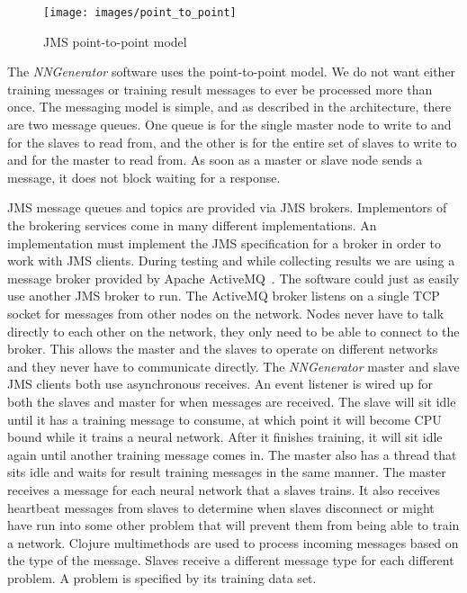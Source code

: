 \begin{figure}[h!]
  \centering
  \texttt{[image: images/point\_to\_point]}
  \caption{JMS point-to-point model}
  \label{point_to_point}
\end{figure}

The {\em NNGenerator} software uses the point-to-point model.
We do not want either training messages or training result messages to ever be processed more than once.
The messaging model is simple, and as described in the architecture, there are two message queues. 
One queue is for the single master node to write to and for the slaves to read from, and the other is for the entire set of slaves to write to and for the master to read from. 
As soon as a master or slave node sends a message, it does not block waiting for a response. 

JMS message queues and topics are provided via JMS brokers.
Implementors of the brokering services come in many different implementations. 
An implementation must implement the JMS specification for a broker in order to work with JMS clients.
During testing and while collecting results we are using a message broker provided by Apache ActiveMQ~\cite{activeMQ}.
The software could just as easily use another JMS broker to run. 
The ActiveMQ broker listens on a single TCP socket for messages from other nodes on the network. 
Nodes never have to talk directly to each other on the network, they only need to be able to connect to the broker. 
This allows the master and the slaves to operate on different networks and they never have to communicate directly.
The {\em NNGenerator} master and slave JMS clients both use asynchronous receives.
An event listener is wired up for both the slaves and master for when messages are received. 
The slave will sit idle until it has a training message to consume, at which point it will become CPU bound while it trains a neural network.
After it finishes training, it will sit idle again until another training message comes in.
The master also has a thread that sits idle and waits for result training messages in the same manner.
The master receives a message for each neural network that a slaves trains. 
It also receives heartbeat messages from slaves to determine when slaves disconnect or might have run into some other problem that will prevent them from being able to train a network. 
Clojure multimethods are used to process incoming messages based on the type of the message. 
Slaves receive a different message type for each different problem. A problem is specified by its training data set. 
